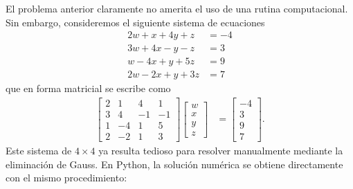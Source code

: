 \documentclass[12pt]{article}
\begin{document}
El problema anterior claramente no amerita el uso de una rutina computacional. 
Sin embargo, consideremos el siguiente sistema de ecuaciones
%
\begin{align*}
   2w +  x + 4y +  z &= -4 \\
   3w + 4x -  y -  z &=  3 \\
    w - 4x +  y + 5z &=  9 \\
   2w - 2x +  y + 3z &=  7
\end{align*}
%
que en forma matricial se escribe como
%
\begin{align*}
   \begin{bmatrix}
      2 &  1 &  4 &  1 \\
      3 &  4 & -1 & -1 \\
      1 & -4 &  1 &  5 \\
      2 & -2 &  1 &  3
   \end{bmatrix}
   \begin{bmatrix}
      w \\
      x \\
      y \\
      z
   \end{bmatrix}
   &=
   \begin{bmatrix}
      -4 \\
       3 \\
       9 \\
       7
   \end{bmatrix}.
\end{align*}
%
Este sistema de $4 \times 4$ ya resulta tedioso para resolver manualmente 
mediante la eliminación de Gauss. En Python, la solución numérica se obtiene 
directamente con el mismo procedimiento:
%
\end{document}
